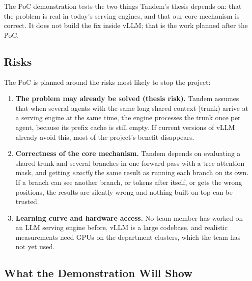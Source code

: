 \documentclass{article}
\begin{document}
The PoC demonstration tests the two things Tandem's thesis depends on:
that the problem is real in today's serving engines, and that our core
mechanism is correct. It does not build the fix inside vLLM; that is the
work planned after the PoC.

\subsection{Risks}

The PoC is planned around the risks most likely to stop the project:

\begin{enumerate}
  \item \textbf{The problem may already be solved (thesis risk).} Tandem
  assumes that when several agents with the same long shared context
  (trunk) arrive at a serving engine at the same time, the engine
  processes the trunk once per agent, because its prefix cache is still
  empty. If current versions of vLLM already avoid this, most of the
  project's benefit disappears.
  \item \textbf{Correctness of the core mechanism.} Tandem depends on
  evaluating a shared trunk and several branches in one forward pass with a
  tree attention mask, and getting \emph{exactly} the same result as running
  each branch on its own. If a branch can see another branch, or tokens
  after itself, or gets the wrong positions, the results are silently wrong
  and nothing built on top can be trusted.
  \item \textbf{Learning curve and hardware access.} No team member has
  worked on an LLM serving engine before, vLLM is a large codebase, and
  realistic measurements need GPUs on the department clusters, which the
  team has not yet used.
\end{enumerate}

\subsection{What the Demonstration Will Show}
\end{document}

